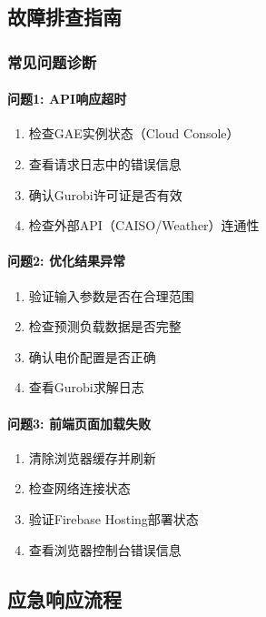 \subsection{故障排查指南}

\subsubsection{常见问题诊断}

\paragraph{问题1: API响应超时}
\begin{enumerate}
    \item 检查GAE实例状态（Cloud Console）
    \item 查看请求日志中的错误信息
    \item 确认Gurobi许可证是否有效
    \item 检查外部API（CAISO/Weather）连通性
\end{enumerate}

\paragraph{问题2: 优化结果异常}
\begin{enumerate}
    \item 验证输入参数是否在合理范围
    \item 检查预测负载数据是否完整
    \item 确认电价配置是否正确
    \item 查看Gurobi求解日志
\end{enumerate}

\paragraph{问题3: 前端页面加载失败}
\begin{enumerate}
    \item 清除浏览器缓存并刷新
    \item 检查网络连接状态
    \item 验证Firebase Hosting部署状态
    \item 查看浏览器控制台错误信息
\end{enumerate}

\subsection{应急响应流程}

